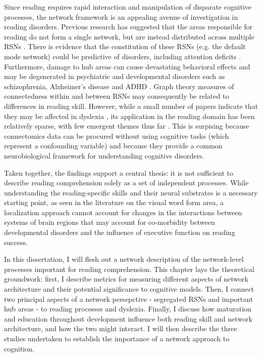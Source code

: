 Since reading requires rapid interaction and manipulation of disparate cognitive processes, the network framework is an appealing avenue of investigation in reading disorders. Previous research has suggested that the areas responsible for reading do not form a single network, but are instead distributed across multiple RSNs \citep{Vogel2013}. There is evidence that the constitution of these RSNs (e.g. the default mode network) could be predictive of disorders, including attention deficits \citep{Uddin2008}. Furthermore, damage to hub areas can cause devastating behavioral effects \citep{Warren2014} and may be degenerated in psychiatric and developmental disorders such as schizophrenia, Alzheimer's disease and ADHD \citep{Stam2014}. Graph theory measures of connectedness within and between RSNs may consequently be related to differences in reading skill. However, while a small number of papers indicate that they may be affected in dyslexia \citep{Qi2016, Finn2014}, its application in the reading domain has been relatively sparse, with few emergent themes thus far \citep{Cao2016}. This is surpising because connectomics data can be procured without using cognitive tasks (which represent a confounding variable) and because they provide a common neurobiological framework for understanding cognitive disorders.

Taken together, the findings support a central thesis: it is not sufficient to describe reading comprehension solely as a set of independent processes. While understanding the reading-specific skills and their neural substrates is a necessary starting point, as seen in the literature on the visual word form area, a localization approach cannot account for changes in the interactions between systems of brain regions that may account for co-morbidity between developmental disorders and the influence of executive function on reading success. 

In this dissertation, I will flesh out a network description of the network-level processes important for reading comprehension. This chapter lays the theoretical groundwork: first, I describe metrics for measuring different aspects of network architecture and their potential significance to cognitive models. Then, I connect two principal aspects of a network persepctive - segregated RSNs and important hub areas - to reading processes and dyslexia. Finally, I discuss how maturation and education throughout development influence both reading skill and network architecture, and how the two might interact. I will then describe the three studies undertaken to establish the importance of a network approach to cognition.


